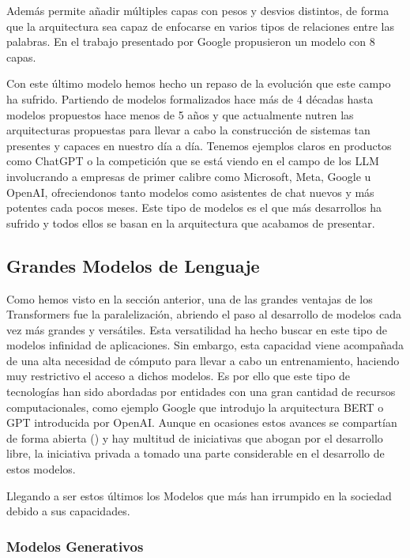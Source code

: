 \begin{itemize}
Además permite añadir múltiples capas con pesos y desvios distintos, de forma que la arquitectura sea capaz de enfocarse en varios tipos de relaciones entre las palabras. En el trabajo presentado por Google propusieron un modelo con 8 capas.

\end{itemize}

Con este último modelo hemos hecho un repaso de la evolución que este campo ha sufrido. Partiendo de modelos formalizados hace más de 4 décadas hasta modelos propuestos hace menos de 5 años y que actualmente nutren las arquitecturas propuestas para llevar a cabo la construcción de sistemas tan presentes y capaces en nuestro día a día. Tenemos ejemplos claros en productos como ChatGPT o la competición que se está viendo en el campo de los LLM involucrando a empresas de primer calibre como Microsoft, Meta, Google u OpenAI, ofreciendonos tanto modelos como asistentes de chat nuevos y más potentes cada pocos meses. Este tipo de modelos es el que más desarrollos ha sufrido y todos ellos se basan en la arquitectura que acabamos de presentar.

\subsection{Grandes Modelos de Lenguaje}

Como hemos visto en la sección anterior, una de las grandes ventajas de los Transformers fue la paralelización, abriendo el paso al desarrollo de modelos cada vez más grandes y versátiles. Esta versatilidad ha hecho buscar en este tipo de modelos infinidad de aplicaciones. Sin embargo, esta capacidad viene acompañada de una alta necesidad de cómputo para llevar a cabo un entrenamiento, haciendo muy restrictivo el acceso a dichos modelos. Es por ello que este tipo de tecnologías han sido abordadas por entidades con una gran cantidad de recursos computacionales, como ejemplo Google que introdujo la arquitectura BERT o GPT introducida por OpenAI. Aunque  en ocasiones estos avances se compartían de forma abierta (\cite{touvron2023llama}) y hay multitud de iniciativas que abogan por el desarrollo libre, la iniciativa privada a tomado una parte considerable en el desarrollo de estos modelos.

Llegando a ser estos últimos los Modelos que más han irrumpido en la sociedad debido a sus capacidades.

\subsubsection{Modelos Generativos}

